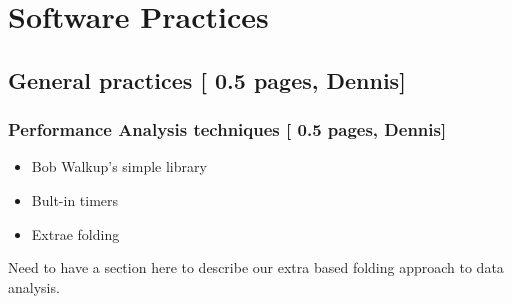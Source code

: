 \section{Software Practices}\label{sec:algorithm}

\subsection{General practices [{\color{red} 0.5 pages, Dennis}]}
 
 \subsubsection{Performance Analysis techniques [{\color{red} 0.5 pages, Dennis]}}
 
 \begin{itemize}
   \item {Bob Walkup's simple library}
   \item {Bult-in timers}
   \item {Extrae folding}
 \end{itemize}
 
 Need to have a section here to describe our extra based folding approach to data analysis.  
 




